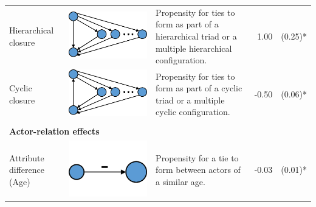 \begin{landscape}
\begin{table}[]
\begin{tabular}{lcp{10cm}rl}
            Hierarchical closure & \begin{minipage}{.2\textwidth} \centering \includegraphics[width=0.8\linewidth]{Images/AT-T} \end{minipage} & Propensity for ties to form as part of a hierarchical triad or a multiple hierarchical configuration. & 1.00 & (0.25)* \\
            Cyclic closure & \begin{minipage}{.2\textwidth} \centering \includegraphics[width=0.8\linewidth]{Images/AT-C} \end{minipage} & Propensity for ties to form as part of a cyclic triad or a multiple cyclic configuration. & -0.50 & (0.06)* \\ \\
            \multicolumn{5}{l}{\textbf{Actor-relation effects}} \\
            Attribute difference (Age) & \begin{minipage}{.2\textwidth} \centering \includegraphics[width=0.45\linewidth]{Images/Difference} \end{minipage} & Propensity for a tie to form between actors of a similar age. & -0.03 & (0.01)* \\

\end{tabular}
\end{table}
\end{landscape}
